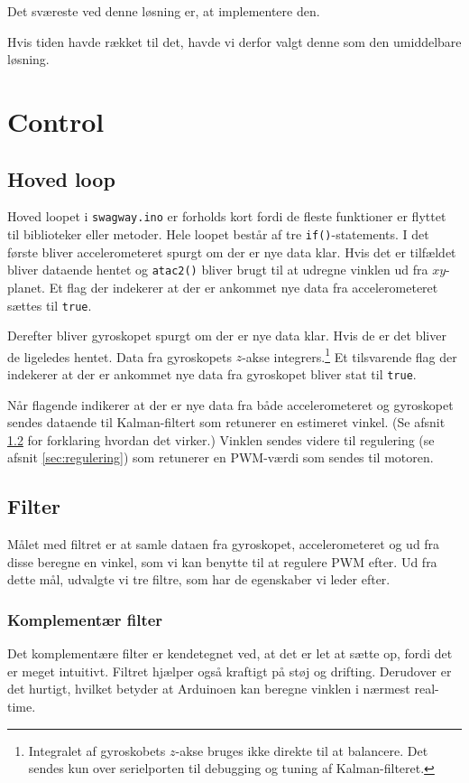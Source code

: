 \documentclass[a4paper,11pt,oneside,article,danish,table]{memoir}
\newcommand{\swino}[2]{}
\begin{document}
Det sværeste ved denne løsning er, at implementere den. 

Hvis tiden havde rækket til det, havde vi derfor valgt denne som den umiddelbare løsning.
\chapter{Control}
\section{Hoved loop}
Hoved loopet i \texttt{swagway.ino} er forholds kort fordi de fleste funktioner er flyttet til biblioteker eller metoder. Hele loopet består af tre \lstinline{if()}-statements. I det første bliver accelerometeret spurgt om der er nye data klar. Hvis det er tilfældet bliver dataende hentet og \lstinline{atac2()} bliver brugt til at udregne vinklen ud fra $xy$-planet. Et flag der indekerer at der er ankommet nye data fra accelerometeret sættes til \lstinline{true}.

Derefter bliver gyroskopet spurgt om der er nye data klar. Hvis de er det bliver de ligeledes hentet. Data fra gyroskopets $z$-akse integrers.\footnote{Integralet af gyroskobets $z$-akse bruges ikke direkte til at balancere. Det sendes kun over serielporten til debugging og tuning af Kalman-filteret.} Et tilsvarende flag der indekerer at der er ankommet nye data fra gyroskopet bliver stat til \lstinline{true}.
\swino{102}{130}
Når flagende indikerer at der er nye data fra både accelerometeret og gyroskopet sendes dataende til Kalman-filtert som retunerer en estimeret vinkel. (Se afsnit \ref{sec:filter} for forklaring hvordan det virker.) Vinklen sendes videre til regulering (se afsnit \ref{sec:regulering}) som retunerer en PWM-værdi som sendes til motoren. 
\section{Filter}\label{sec:filter}
Målet med filtret er at samle dataen fra gyroskopet, accelerometeret og ud fra disse beregne en vinkel, som vi kan benytte til at regulere PWM efter. Ud fra dette mål, udvalgte vi tre filtre, som har de egenskaber vi leder efter.
\subsection{Komplementær filter}
Det komplementære filter er kendetegnet ved, at det er let at sætte op, fordi det er meget intuitivt. Filtret hjælper også kraftigt på støj og drifting. Derudover er det hurtigt, hvilket betyder at Arduinoen kan beregne vinklen i nærmest real-time. 
\end{document}
